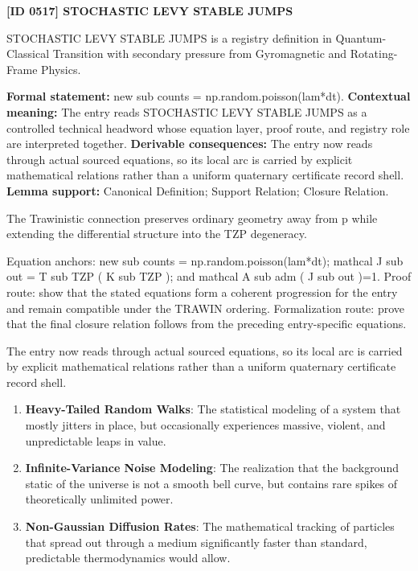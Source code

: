 \clearpage
\noindent\textbf{[ID 0517] STOCHASTIC LEVY STABLE JUMPS}\par
\vspace{0.35em}
\begingroup\small
{}
STOCHASTIC LEVY STABLE JUMPS is a registry definition in Quantum-Classical Transition with secondary pressure from Gyromagnetic and Rotating-Frame Physics.

\begingroup\footnotesize\setlength{\emergencystretch}{3em}\sloppy
\textbf{Formal statement:} new sub counts = np.random.poisson(lam*dt). \textbf{Contextual meaning:} The entry reads STOCHASTIC LEVY STABLE JUMPS as a controlled technical headword whose equation layer, proof route, and registry role are interpreted together. \textbf{Derivable consequences:} The entry now reads through actual sourced equations, so its local arc is carried by explicit mathematical relations rather than a uniform quaternary certificate record shell. \textbf{Lemma support:} Canonical Definition; Support Relation; Closure Relation.\par
\endgroup

The Trawinistic connection preserves ordinary geometry away from p while extending the differential structure into the TZP degeneracy.

Equation anchors: new sub counts = np.random.poisson(lam*dt); mathcal J sub out = T sub TZP ( K sub TZP ); and mathcal A sub adm ( J sub out )=1. Proof route: show that the stated equations form a coherent progression for the entry and remain compatible under the TRAWIN ordering. Formalization route: prove that the final closure relation follows from the preceding entry-specific equations.

The entry now reads through actual sourced equations, so its local arc is carried by explicit mathematical relations rather than a uniform quaternary certificate record shell.
\endgroup

\begin{enumerate}[leftmargin=1.6em,itemsep=6pt,topsep=4pt]
\item \textbf{Heavy-Tailed Random Walks}: The statistical modeling of a system that mostly jitters in place, but occasionally experiences massive, violent, and unpredictable leaps in value.
\item \textbf{Infinite-Variance Noise Modeling}: The realization that the background static of the universe is not a smooth bell curve, but contains rare spikes of theoretically unlimited power.
\item \textbf{Non-Gaussian Diffusion Rates}: The mathematical tracking of particles that spread out through a medium significantly faster than standard, predictable thermodynamics would allow.
\end{enumerate}

